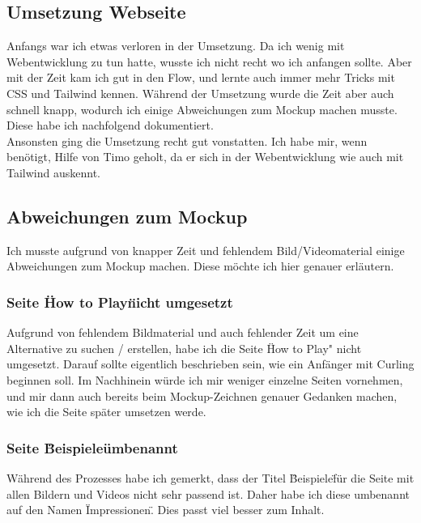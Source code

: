 \documentclass[11pt]{article}
\begin{document}
    \subsection{Umsetzung Webseite}
    Anfangs war ich etwas verloren in der Umsetzung. Da ich wenig mit Webentwicklung zu tun hatte, wusste ich nicht recht wo ich anfangen sollte.
    Aber mit der Zeit kam ich gut in den Flow, und lernte auch immer mehr Tricks mit CSS und Tailwind kennen. Während der Umsetzung wurde die Zeit
    aber auch schnell knapp, wodurch ich einige Abweichungen zum Mockup machen musste. Diese habe ich nachfolgend dokumentiert.\\
    Ansonsten ging die Umsetzung recht gut vonstatten. Ich habe mir, wenn benötigt, Hilfe von Timo geholt, da er sich in der Webentwicklung wie auch
    mit Tailwind auskennt.

    \subsection{Abweichungen zum Mockup}
    Ich musste aufgrund von knapper Zeit und fehlendem Bild/Videomaterial einige Abweichungen zum Mockup machen. Diese möchte ich hier genauer erläutern.

    \subsubsection{Seite \"How to Play\" nicht umgesetzt}
    Aufgrund von fehlendem Bildmaterial und auch fehlender Zeit um eine Alternative zu suchen / erstellen, habe ich die Seite \"How to Play" nicht umgesetzt.
    Darauf sollte eigentlich beschrieben sein, wie ein Anfänger mit Curling beginnen soll. Im Nachhinein würde ich mir weniger einzelne Seiten vornehmen, und
    mir dann auch bereits beim Mockup-Zeichnen genauer Gedanken machen, wie ich die Seite später umsetzen werde.

    \subsubsection{Seite \"Beispiele\" umbenannt}
    Während des Prozesses habe ich gemerkt, dass der Titel \"Beispiele\" für die Seite mit allen Bildern und Videos nicht sehr passend ist. Daher habe ich
    diese umbenannt auf den Namen \"Impressionen\". Dies passt viel besser zum Inhalt.
\end{document}
